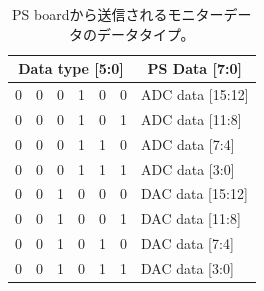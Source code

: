 
\begin{table}[]
    \centering
    \caption[PS boardから送信されるモニターデータのデータタイプ]{PS boardから送信されるモニターデータのデータタイプ。}
    \label{tab:PSBdatatype}
    \begin{tabular}{|cccccc|l|}
    \hline
    \multicolumn{6}{|c}{Data type {[}5:0{]}}                                                                                       & \multicolumn{1}{|c|}{PS Data {[}7:0{]}} \\ \hline\hline
    \multicolumn{1}{|c}{0} & 0                      & 0                      & 1                      & 0                      & 0 & ADC data {[}15:12{]}                   \\  
    \multicolumn{1}{|c}{0} & 0                      & 0                      & 1                      & 0                      & 1 & ADC data {[}11:8{]}                    \\  
    \multicolumn{1}{|c}{0} & 0                      & 0                      & 1                      & 1                      & 0 & ADC data {[}7:4{]}                     \\  
    \multicolumn{1}{|c}{0} & 0                      & 0                      & 1                      & 1                      & 1 & ADC data {[}3:0{]}                     \\  \hline
    \multicolumn{1}{|c}{0} & 0                      & 1                      & 0                      & 0                      & 0 & DAC data {[}15:12{]}                   \\  
    \multicolumn{1}{|c}{0} & 0                      & 1                      & 0                      & 0                      & 1 & DAC data {[}11:8{]}                    \\  
    \multicolumn{1}{|c}{0} & 0                      & 1                      & 0                      & 1                      & 0 & DAC data {[}7:4{]}                     \\  
    \multicolumn{1}{|c}{0} & 0                      & 1                      & 0                      & 1                      & 1 & DAC data {[}3:0{]}                     \\  \hline

\end{tabular}
\end{table}
